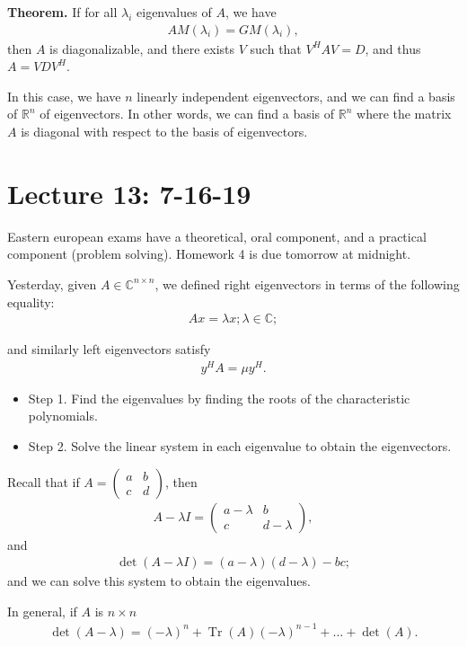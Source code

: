 \documentclass{article}
\newcommand{\mat}[1]{\begin{pmatrix}#1\end{pmatrix}}
\newcommand{\RR}{\mathbb{R}}
\newcommand{\CC}{\mathbb{C}}
\DeclareMathOperator{\Tr}{Tr}
\begin{document}
{\bf Theorem.} If for all $\lambda_i$ eigenvalues of $A$, we have
\begin{align*}
  AM(\lambda_i) = GM (\lambda_i),
\end{align*}
then $A$ is diagonalizable, and there exists $V$ such that $V^H A V = D$, and thus $A = V D V^H$.

In this case, we have $n$ linearly independent eigenvectors, and we can find a basis of $\RR^n$ of eigenvectors.  In other words, we can find a basis of $\RR^n$ where the matrix $A$ is diagonal with respect to the basis of eigenvectors.

\section{Lecture 13: 7-16-19}

Eastern european exams have a theoretical, oral component, and a practical component (problem solving).  Homework 4 is due tomorrow at midnight.

Yesterday, given $A \in \mathbb{C}^{n \times n}$, we defined right eigenvectors in terms of the following equality:
\begin{align*}
  Ax = \lambda x; \lambda \in \CC;
\end{align*}

and similarly left eigenvectors satisfy
\begin{align*}
  y^H A = \mu y^H.
\end{align*}

\begin{itemize}
  \item Step 1. Find the eigenvalues by finding the roots of the characteristic polynomials.
  \item Step 2. Solve the linear system in each eigenvalue to obtain the eigenvectors.
\end{itemize}

Recall that if $A = \mat{a & b \\ c & d}$, then
\begin{align*}
  A - \lambda I = \mat{a - \lambda & b \\ c & d - \lambda},
\end{align*}
and
\begin{align*}
  \det (A - \lambda I) = (a - \lambda)(d - \lambda) - bc;
\end{align*}
and we can solve this system to obtain the eigenvalues.

In general, if $A$ is $n \times n$
\begin{align*}
  \det (A - \lambda) = (- \lambda)^n + \Tr (A) (-\lambda)^{n-1} + \dots + \det (A).
\end{align*}
\end{document}
